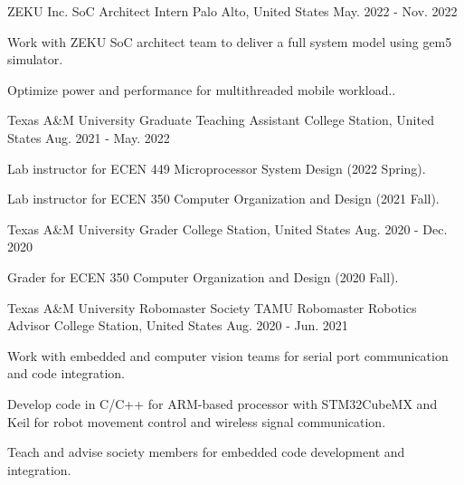 
\begin{cventries}
    \cventry
    {ZEKU Inc.} %
    {SoC Architect Intern} %
    {Palo Alto, United States} %
    {May. 2022 - Nov. 2022} %
    {
      \begin{cvitems} %
        \item {Work with ZEKU SoC architect team to deliver a full system model using gem5 simulator.}
        \item {Optimize power and performance for multithreaded mobile workload..}
      \end{cvitems}
    }
    
    \cventry
    {Texas A\&M University} %
    {Graduate Teaching Assistant} %
    {College Station, United States} %
    {Aug. 2021 - May. 2022} %
    {
      \begin{cvitems} %
        \item {Lab instructor for ECEN 449 Microprocessor System Design (2022 Spring).}
        \item {Lab instructor for ECEN 350 Computer Organization and Design (2021 Fall).}
      \end{cvitems}
    }
    
  \cventry
    {Texas A\&M University} %
    {Grader} %
    {College Station, United States} %
    {Aug. 2020 - Dec. 2020} %
    {
      \begin{cvitems} %
        \item {Grader for ECEN 350 Computer Organization and Design (2020 Fall).}
      \end{cvitems}
    }
    
  \cventry
    {Texas A\&M University Robomaster Society} %
    {TAMU Robomaster Robotics Advisor} %
    {College Station, United States} %
    {Aug. 2020 - Jun. 2021} %
    {
      \begin{cvitems} %
        \item {Work with embedded and computer vision teams for serial port communication and code integration.}
        \item {Develop code in C/C++ for ARM-based processor with STM32CubeMX and Keil for robot movement control and wireless signal communication.}
        \item {Teach and advise society members for embedded code development and integration.}
      \end{cvitems}
    }


\end{cventries}
